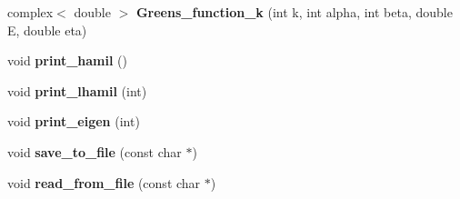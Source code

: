 \begin{DoxyCompactItemize}
\item 
complex$<$ double $>$ {\bfseries Greens\+\_\+function\+\_\+k} (int k, int alpha, int beta, double E, double eta)\hypertarget{classlhamil_a22e29163bcb08ab415f3814490926d5c}{}\label{classlhamil_a22e29163bcb08ab415f3814490926d5c}

\item 
void {\bfseries print\+\_\+hamil} ()\hypertarget{classlhamil_ad4fb3d36c5dc5def8509f0a26d400579}{}\label{classlhamil_ad4fb3d36c5dc5def8509f0a26d400579}

\item 
void {\bfseries print\+\_\+lhamil} (int)\hypertarget{classlhamil_ab68145bc253a27018f0ff75b80a3d230}{}\label{classlhamil_ab68145bc253a27018f0ff75b80a3d230}

\item 
void {\bfseries print\+\_\+eigen} (int)\hypertarget{classlhamil_a2c26e7bbd48b2d7f46309508fc99854e}{}\label{classlhamil_a2c26e7bbd48b2d7f46309508fc99854e}

\item 
void {\bfseries save\+\_\+to\+\_\+file} (const char $\ast$)\hypertarget{classlhamil_adf3f7541e5922c3a6f03456edf924d1b}{}\label{classlhamil_adf3f7541e5922c3a6f03456edf924d1b}

\item 
void {\bfseries read\+\_\+from\+\_\+file} (const char $\ast$)\hypertarget{classlhamil_a0486bea26b7fc3c7544f75f3b70caa3e}{}\label{classlhamil_a0486bea26b7fc3c7544f75f3b70caa3e}

\end{DoxyCompactItemize}
